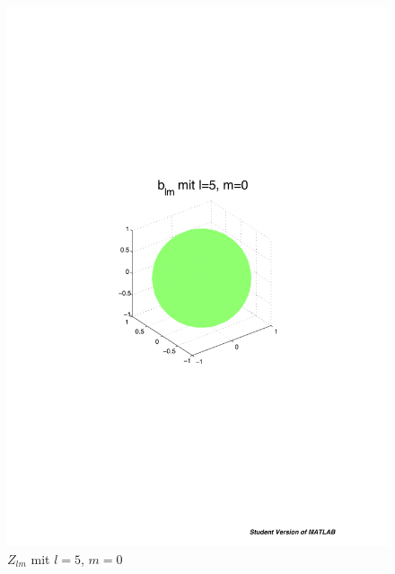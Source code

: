 \begin{refsection}
\begin{figure}
\begin{minipage}[hbt]{0.4\textwidth}
\includegraphics[width=1\textwidth]{kugel/ylm/b_5_0.pdf}
\caption{$Z_{lm}$ mit $l=5$, $m=0$}
\label{skript:zlm l=5 m=0}
\end{minipage}
\begin{minipage}[hbt]{0.4\textwidth}
\centering

\end{minipage}
\end{figure}
\end{refsection}
